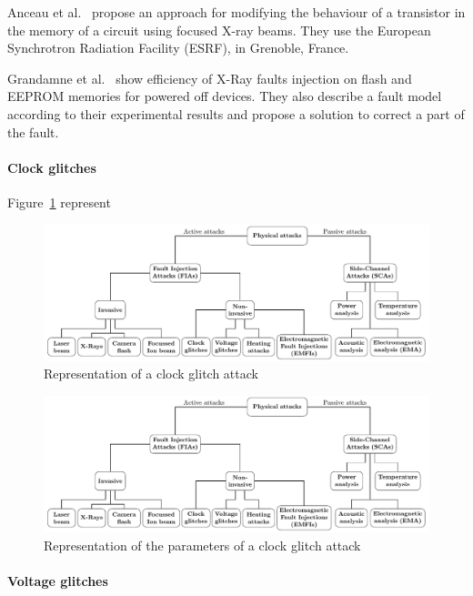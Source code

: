 Anceau et al.~\cite{ABCMRT-17-ches, BAMCST-23-dft} propose an approach for modifying the behaviour of a transistor in the memory of a circuit using focused X-ray beams. 
They use the European Synchrotron Radiation Facility (ESRF), in Grenoble, France.

Grandamne et al.~\cite{GBD-23-paine} show efficiency of X-Ray faults injection on flash and EEPROM memories for powered off devices. They also describe a fault model according to their experimental results and propose a solution to correct a part of the fault.

\paragraph{Clock glitches} 

Figure~\ref{fig:clock_glitch} represent

\begin{figure}[ht]
    \centering
    \includegraphics[page=4]{c2_soa/img/physicalAttacks.pdf}
    \caption{Representation of a clock glitch attack}
    \label{fig:clock_glitch}
\end{figure}


\begin{figure}[ht]
    \centering
    \includegraphics[page=5]{c2_soa/img/physicalAttacks.pdf}
    \caption{Representation of the parameters of a clock glitch attack}
    \label{fig:clock_glitch_parameters}
\end{figure}

\paragraph{Voltage glitches}

